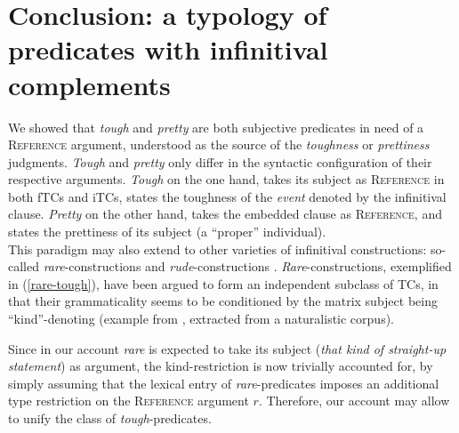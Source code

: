 \documentclass[11pt]{article}
\begin{document}
\section*{Conclusion: a typology of predicates with infinitival complements}\label{sec:conclusion}		
	 We showed that \textit{tough} and \textit{pretty} are both subjective predicates in need of a \textsc{Reference} argument, understood as the source of the \textit{toughness} or \textit{prettiness} judgments.
	 \textit{Tough} and \textit{pretty} only differ in the syntactic configuration of their respective arguments. \textit{Tough} on the one hand, takes its subject as \textsc{Reference} in both fTCs and iTCs, states the toughness of the \textit{event} denoted by the infinitival clause. \textit{Pretty} on the other hand, takes the embedded clause as \textsc{Reference}, and states the prettiness of its subject (a ``proper'' individual).\\
	 
	 This paradigm may also extend to other varieties of infinitival constructions: so-called \textit{rare}-constructions \cite{Fleisher2015} and \textit{rude}-constructions \cite{Stowell1991, Bennis2000, Bennis2004, Landau2006}.
	 \textit{Rare}-constructions, exemplified in (\ref{rare-tough}), have been argued to form an independent subclass of TCs, in that their grammaticality seems to be conditioned by the matrix subject being ``kind''-denoting (example from \cite{Fleisher2015}, extracted from a naturalistic corpus).
	\begin{exe}
		 \label{rare-tough}
	\end{exe}
	Since in our account \textit{rare} is expected to take its subject (\textit{that kind of straight-up statement}) as argument, the kind-restriction is now trivially accounted for, by simply assuming that the lexical entry of \textit{rare}-predicates imposes an additional type restriction on the \textsc{Reference} argument $r$. Therefore, our account may allow to unify the class of \textit{tough}-predicates.\\
\end{document}
